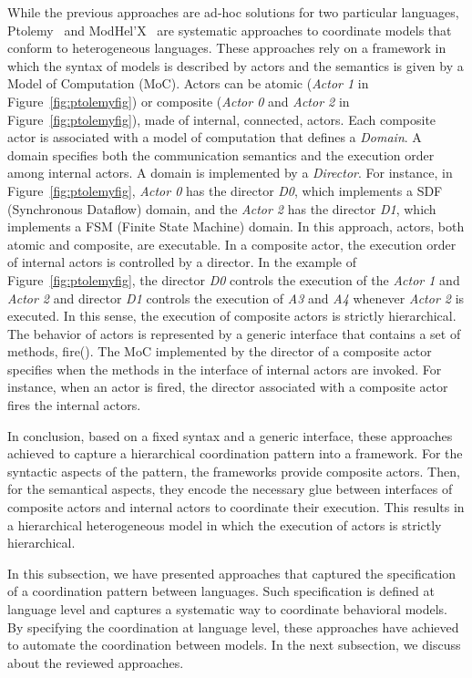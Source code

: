While the previous approaches are ad-hoc solutions for two particular languages, Ptolemy~\cite{ptoleframebib} and ModHel'X~\cite{modhelxbib} are systematic approaches to coordinate models that conform to heterogeneous languages. These approaches rely on a framework in which the syntax of models is described by actors and the semantics is given by a Model of Computation (MoC). Actors can be atomic (\eg \emph{Actor 1} in Figure~\ref{fig:ptolemyfig}) or composite (\eg \emph{Actor 0} and \emph{Actor 2} in Figure~\ref{fig:ptolemyfig}), \ie made of internal, connected, actors. Each composite actor is associated with a model of computation that defines a \emph{Domain}. A domain specifies both the communication semantics and the execution order among internal actors. A domain is implemented by a \emph{Director}. For instance, in Figure~\ref{fig:ptolemyfig}, \emph{Actor 0} has the director \emph{D0}, which implements a SDF (Synchronous Dataflow) domain, and the \emph{Actor 2} has the director \emph{D1}, which implements a FSM (Finite State Machine) domain. In this approach, actors, both atomic and composite, are executable. In a composite actor, the execution order of internal actors is controlled by a director. In the example of Figure~\ref{fig:ptolemyfig}, the director \emph{D0} controls the execution of the \emph{Actor 1} and \emph{Actor 2} and director \emph{D1} controls the execution of \emph{A3} and \emph{A4} whenever \emph{Actor 2} is executed. In this sense, the execution of composite actors is strictly hierarchical. The behavior of actors is represented by a generic interface that contains a set of methods, \eg fire(). The MoC implemented by the director of a composite actor specifies when the methods in the interface of internal actors are invoked. For instance, when an actor is fired, the director associated with a composite actor fires the internal actors. 

In conclusion, based on a fixed syntax and a generic interface, these approaches achieved to capture a hierarchical coordination pattern into a framework. For the syntactic aspects of the pattern, the frameworks provide composite actors. Then, for the semantical aspects, they encode the necessary glue between interfaces of composite actors and internal actors to coordinate their execution. This results in a hierarchical heterogeneous model in which the execution of actors is strictly hierarchical.

In this subsection, we have presented approaches that captured the specification of a coordination pattern between languages. Such specification is defined at language level and captures a systematic way to coordinate behavioral models. By specifying the coordination at language level, these approaches have achieved to automate the coordination between models. In the next subsection, we discuss about the reviewed approaches.   

